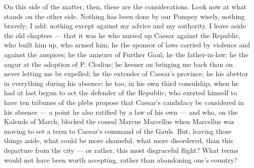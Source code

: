 On this side of the matter, then, these are the considerations. Look now at what stands on the other side. Nothing has been done by our Pompey wisely, nothing bravely; I add: nothing except against my advice and my authority. I leave aside the old chapters --- that it was he who nursed up Caesar against the Republic, who built him up, who armed him; he the sponsor of laws carried by violence and against the auspices; he the annexer of Further Gaul; he the father-in-law; he the augur at the adoption of P. Clodius; he keener on bringing me back than on never letting me be expelled; he the extender of Caesar's province; he his abettor in everything during his absence; he too, in his own third consulship, when he had at last begun to act the defender of the Republic, who exerted himself to have ten tribunes of the plebs propose that Caesar's candidacy be considered in his absence --- a point he also ratified by a law of his own --- and who, on the Kalends of March, blocked the consul Marcus Marcellus when Marcellus was moving to set a term to Caesar's command of the Gauls. But, leaving those things aside, what could be more shameful, what more disordered, than this departure from the city --- or rather, this most disgraceful flight? What terms would not have been worth accepting, rather than abandoning one's country?

